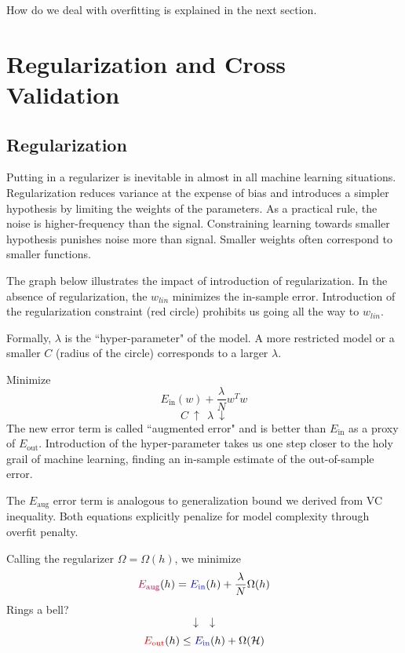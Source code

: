 \documentclass[10pt]{article}
\numberwithin{equation}{section}  %
\begin{document}
How do we deal with overfitting is explained in the next section.


\section{Regularization and Cross Validation}

\subsection{Regularization}

Putting in a regularizer is inevitable in almost in all machine learning situations. Regularization reduces variance at the expense of bias and introduces a simpler hypothesis by limiting the weights of the parameters. As a practical rule, the noise is higher-frequency than the signal. Constraining learning towards smaller hypothesis punishes noise more than signal. Smaller weights often correspond to smaller functions.

The graph below illustrates the impact of introduction of regularization. In the absence of regularization, the $w_{lin}$ minimizes the in-sample error. Introduction of the regularization constraint (red circle) prohibits us going all the way to $w_{lin}$.

Formally, $\lambda$ is the ``hyper-parameter" of the model. A more restricted model or a smaller $C$ (radius of the circle) corresponds to a larger $\lambda$.

Minimize
\begin{equation*}
    E_\mathrm{in}(w)+\frac{\lambda}{N}w^Tw
\end{equation*}
\[
\boxed{C\ \uparrow\ \ \lambda\ \downarrow}
\]
The new error term is called ``augmented error" and is better than $E_\mathrm{in}$ as a proxy of $E_\mathrm{out}$. Introduction of the hyper-parameter takes us one step closer to the holy grail of machine learning, finding an in-sample estimate of the out-of-sample error.

The $E_\mathrm{aug}$ error term is analogous to generalization bound we derived from VC inequality. Both equations explicitly penalize for model complexity through overfit penalty.

Calling the regularizer $\Omega=\Omega(h)$, we minimize
\[
    \textcolor{purple}{E_\mathrm{aug}}(h) = \textcolor{blue}{E_\mathrm{in}}(h) + \frac{\lambda}{N}\Omega(h)
\]
Rings a bell?
\[
    \downarrow\ \ \downarrow
\]
\[
    \textcolor{red}{E_\mathrm{out}}(h) \leq \textcolor{blue}{E_\mathrm{in}}(h) + \Omega(\mathcal{H})
\]
\end{document}
